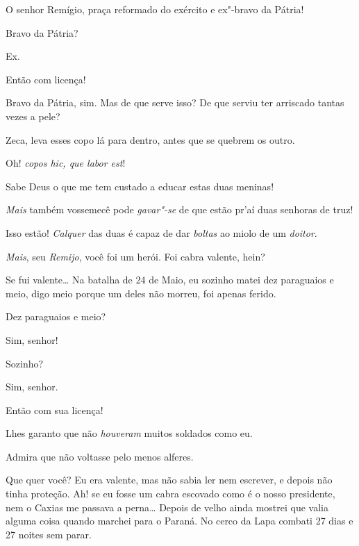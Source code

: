 \begin{linenumbers}
 O senhor Remígio, praça reformado do exército e ex"-bravo
da Pátria!

   Bravo da Pátria?

 Ex.

 Então com licença! 

Bravo da Pátria, sim. Mas de que serve isso? De que serviu ter arriscado tantas
vezes a pele? 

 Zeca, leva esses copo lá para dentro, antes que
se quebrem os outro.

 Oh!  \textit{copos hic, que labor est}!

Sabe Deus o que me tem custado a educar
estas duas meninas!

 \textit{Mais} também vossemecê pode \textit{gavar"-se} de que estão
pr'aí duas senhoras de truz!

 Isso estão! \textit{Calquer} das duas é capaz de dar
\textit{boltas} ao miolo de um \textit{doitor}.

 \textit{Mais}, seu \textit{Remijo}, você foi um herói. Foi cabra
valente, hein?

 Se fui valente\ldots{} Na batalha de 24 de Maio, eu
sozinho matei dez paraguaios e meio, digo meio porque um deles não morreu, foi
apenas ferido.

 Dez paraguaios e meio?

 Sim, senhor!

 Sozinho?

 Sim, senhor.

 Então com sua licença! 

 Lhes garanto que não \textit{houveram} muitos soldados como
eu.

 Admira que não voltasse pelo menos alferes.

 Que quer você? Eu era valente, mas não
sabia ler nem escrever, e depois não tinha proteção. Ah! se eu fosse um cabra
escovado como é o nosso presidente, nem o Caxias me passava a perna\ldots{} Depois de
velho ainda mostrei que valia alguma coisa quando marchei para o Paraná. No
cerco da Lapa combati 27 dias e 27 noites sem parar.


\end{linenumbers}
